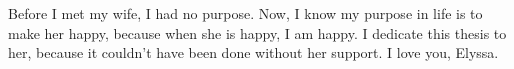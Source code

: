Before I met my wife, I had no purpose. Now, I know my purpose in life is to make her happy, because when she is happy, I am happy. I dedicate this thesis to her, because it couldn't have been done without her support. I love you, Elyssa.
